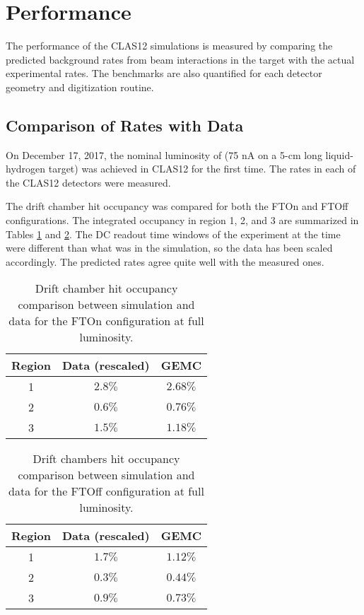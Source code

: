 \section{Performance}

The performance of the CLAS12 simulations is measured by comparing the predicted background rates from beam interactions
in the target with the actual experimental rates. The benchmarks are also quantified for each detector geometry and digitization routine.

\subsection{Comparison of Rates with Data}
On December 17, 2017, the nominal luminosity of \cLuminosity
(75 nA on a 5-cm long liquid-hydrogen target) was achieved in CLAS12 for the first time.
The rates in each of the CLAS12 detectors were measured.

The drift chamber hit occupancy was compared for both the FTOn and FTOff configurations. The integrated occupancy
in region 1, 2, and 3 are summarized in Tables \ref{tab:ftOnComparison} and \ref{tab:ftOffComparison}. The
DC readout time windows of the experiment at the time were different than what was in the simulation, so the data has been scaled
accordingly. The predicted rates agree quite well with the measured ones.

\begin{table}[h]
	\begin{center}
		\begin{tabular}{| c | c | c |}
			\hline \hline
			Region & Data (rescaled) &  GEMC \\
			\hline
			1 &  $2.8\%$  & $2.68\%$ \\
			2 &  $0.6\%$  & $0.76\%$ \\
			3 &  $1.5\%$  & $1.18\%$ \\
		\hline \hline
		\end{tabular}
	\end{center}
	\caption{Drift chamber hit occupancy comparison between simulation and data for the FTOn configuration at full luminosity.}\label{tab:ftOnComparison}
\end{table}

\begin{table}[h]
	\begin{center}
		\begin{tabular}{| c | c | c |}
			\hline \hline
			Region & Data (rescaled) &  GEMC \\
			\hline
			1 &  $1.7\%$  & $1.12\%$ \\
			2 &  $0.3\%$  & $0.44\%$ \\
			3 &  $0.9\%$  & $0.73\%$ \\
		\hline \hline
		\end{tabular}
	\end{center}
	\caption{Drift chambers hit occupancy comparison between simulation and data for the FTOff configuration at full luminosity.}\label{tab:ftOffComparison}
\end{table}


